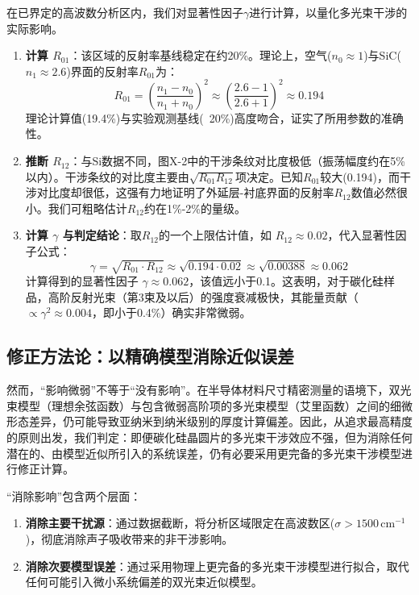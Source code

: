 \documentclass[withoutpreface,bwprint]{cumcmthesis} %
\begin{document}
在已界定的高波数分析区内，我们对显著性因子$\gamma$进行计算，以量化多光束干涉的实际影响。
\begin{enumerate}
    \item \textbf{计算 $R_{01}$}：该区域的反射率基线稳定在约20\%。理论上，空气($n_0 \approx 1$)与SiC($n_1 \approx 2.6$)界面的反射率$R_{01}$为：
    \begin{equation}
        R_{01} = \left( \frac{n_1 - n_0}{n_1 + n_0} \right)^2 \approx \left( \frac{2.6 - 1}{2.6 + 1} \right)^2 \approx 0.194
    \end{equation}
    理论计算值(19.4\%)与实验观测基线(~20\%)高度吻合，证实了所用参数的准确性。

    \item \textbf{推断 $R_{12}$}：与Si数据不同，图X-2中的干涉条纹对比度极低（振荡幅度约在5\%以内）。干涉条纹的对比度主要由$\sqrt{R_{01}R_{12}}$项决定。已知$R_{01}$较大(0.194)，而干涉对比度却很低，这强有力地证明了外延层-衬底界面的反射率$R_{12}$数值必然很小。我们可粗略估计$R_{12}$约在1\%-2\%的量级。
    
    \item \textbf{计算 $\gamma$ 与判定结论}：取$R_{12}$的一个上限估计值，如 $R_{12} \approx 0.02$，代入显著性因子公式：
    \begin{equation}
        \gamma = \sqrt{R_{01} \cdot R_{12}} \approx \sqrt{0.194 \cdot 0.02} \approx \sqrt{0.00388} \approx 0.062
    \end{equation}
    计算得到的显著性因子 $\gamma \approx 0.062$，该值远小于0.1。这表明，对于碳化硅样品，高阶反射光束（第3束及以后）的强度衰减极快，其能量贡献（$\propto \gamma^2 \approx 0.004$，即小于0.4\%）确实非常微弱。
\end{enumerate}

\subsection{修正方法论：以精确模型消除近似误差}

然而，“影响微弱”不等于“没有影响”。在半导体材料尺寸精密测量的语境下，双光束模型（理想余弦函数）与包含微弱高阶项的多光束模型（艾里函数）之间的细微形态差异，仍可能导致亚纳米到纳米级别的厚度计算偏差。因此，从追求最高精度的原则出发，我们判定：即便碳化硅晶圆片的多光束干涉效应不强，但为消除任何潜在的、由模型近似所引入的系统误差，仍有必要采用更完备的多光束干涉模型进行修正计算。

“消除影响”包含两个层面：
\begin{enumerate}
    \item \textbf{消除主要干扰源}：通过数据截断，将分析区域限定在高波数区($\sigma > 1500 \, \text{cm}^{-1}$)，彻底消除声子吸收带来的非干涉影响。
    \item \textbf{消除次要模型误差}：通过采用物理上更完备的多光束干涉模型进行拟合，取代任何可能引入微小系统偏差的双光束近似模型。
\end{enumerate}
\end{document}
